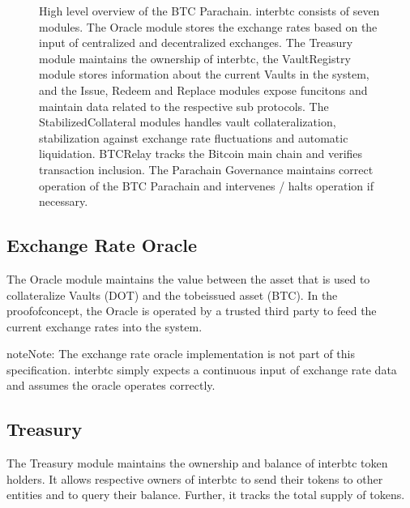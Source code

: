 \documentclass[a4paper,10pt,english]{sphinxmanual}
\begin{document}
\begin{figure}[htbp]
\centering
\capstart

\noindent{}
\caption{High level overview of the BTC Parachain. interbtc consists of seven modules. The Oracle module stores the exchange rates based on the input of centralized and decentralized exchanges. The Treasury module maintains the ownership of interbtc, the VaultRegistry module stores information about the current Vaults in the system, and the Issue, Redeem and Replace modules expose funcitons and maintain data related to the respective sub protocols. The StabilizedCollateral modules handles vault collateralization, stabilization against exchange rate fluctuations and automatic liquidation. BTC\sphinxhyphen{}Relay tracks the Bitcoin main chain and verifies transaction inclusion. The Parachain Governance maintains correct operation of the BTC Parachain and intervenes / halts operation if necessary.}\label{\detokenize{intro/architecture:id2}}\label{\detokenize{intro/architecture:high-level}}\end{figure}


\subsection{Exchange Rate Oracle}
\label{\detokenize{intro/architecture:exchange-rate-oracle}}
The Oracle module maintains the  value between the asset that is used to collateralize Vaults (DOT) and the to\sphinxhyphen{}be\sphinxhyphen{}issued asset (BTC).
In the proof\sphinxhyphen{}of\sphinxhyphen{}concept, the Oracle is operated by a trusted third party to feed the current exchange rates into the system.

\begin{sphinxadmonition}{note}{Note:}
The exchange rate oracle implementation is not part of this specification. interbtc simply expects a continuous input of exchange rate data and assumes the oracle operates correctly.
\end{sphinxadmonition}


\subsection{Treasury}
\label{\detokenize{intro/architecture:treasury}}
The Treasury module maintains the ownership and balance of interbtc token holders. It allows respective owners of interbtc to send their tokens to other entities  and to query their balance.
Further, it tracks the total supply of tokens.
\end{document}
